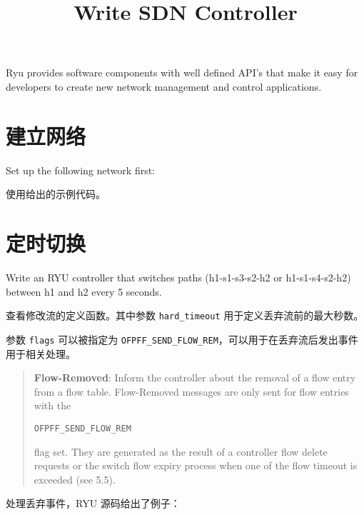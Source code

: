 \endofdump
{}

    \title{Write SDN Controller}
    \maketitle
    \tableofcontents
    \vfill
    Ryu provides software components with well defined API's that make it easy for developers to create new network management and control applications.
    \vfill
    \clearpage
    \section{建立网络}
    Set up the following network first:
    
    \hfill
    

    使用给出的示例代码。

    \section{定时切换}
    Write an RYU controller that switches paths (h1-s1-s3-s2-h2 or h1-s1-s4-s2-h2) between h1 and h2 every 5 seconds. 

    查看修改流的定义函数。其中参数 \texttt{hard\_timeout} 用于定义丢弃流前的最大秒数。

    
    参数 \texttt{flags} 可以被指定为 \texttt{OFPFF\_SEND\_FLOW\_REM}，可以用于在丢弃流后发出事件用于相关处理。

    \begin{quotation}
    \textbf{Flow-Removed}: Inform the controller about the removal of a flow entry from a flow table. Flow-Removed messages are only sent for flow entries with the 
    \begin{center}
        \verb"OFPFF_SEND_FLOW_REM"
    \end{center} flag set. They are
generated as the result of a controller flow delete requests or the switch flow expiry process when one of the
flow timeout is exceeded (see 5.5).\cite{openflow13}
    \end{quotation}


    处理丢弃事件，RYU 源码给出了例子：


